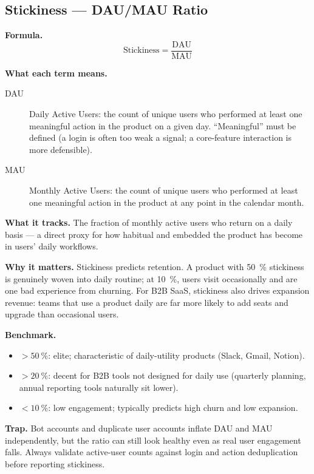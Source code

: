 \subsection{Stickiness --- DAU/MAU Ratio}

\textbf{Formula.}
\[
  \text{Stickiness} = \frac{\mathrm{DAU}}{\mathrm{MAU}}
\]

\textbf{What each term means.}
\begin{description}
  \item[DAU] Daily Active Users: the count of unique users who performed at least one
    meaningful action in the product on a given day. ``Meaningful'' must be defined (a
    login is often too weak a signal; a core-feature interaction is more defensible).
  \item[MAU] Monthly Active Users: the count of unique users who performed at least one
    meaningful action in the product at any point in the calendar month.
\end{description}

\textbf{What it tracks.} The fraction of monthly active users who return on a daily basis
--- a direct proxy for how habitual and embedded the product has become in users' daily
workflows.

\textbf{Why it matters.} Stickiness predicts retention. A product with \qty{50}{\percent}
stickiness is genuinely woven into daily routine; at \qty{10}{\percent}, users visit
occasionally and are one bad experience from churning. For B2B SaaS, stickiness also drives
expansion revenue: teams that use a product daily are far more likely to add seats and
upgrade than occasional users.

\textbf{Benchmark.}
\begin{itemize}
  \item $>\qty{50}{\percent}$: elite; characteristic of daily-utility products (Slack,
    Gmail, Notion).
  \item $>\qty{20}{\percent}$: decent for B2B tools not designed for daily use (quarterly
    planning, annual reporting tools naturally sit lower).
  \item $<\qty{10}{\percent}$: low engagement; typically predicts high churn and low
    expansion.
\end{itemize}

\textbf{Trap.} Bot accounts and duplicate user accounts inflate DAU and MAU independently,
but the ratio can still look healthy even as real user engagement falls. Always validate
active-user counts against login and action deduplication before reporting stickiness.

